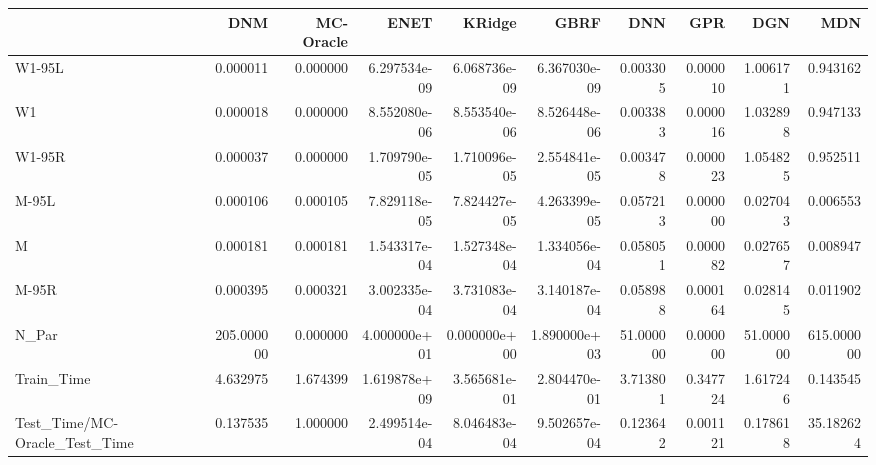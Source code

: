 \begin{tabular}{lrrrrrrrrr}
\toprule
{} &         DNM &  MC-Oracle &          ENET &        KRidge &          GBRF &        DNN &       GPR &        DGN &         MDN \\
\midrule
W1-95L                        &    0.000011 &   0.000000 &  6.297534e-09 &  6.068736e-09 &  6.367030e-09 &   0.003305 &  0.000010 &   1.006171 &    0.943162 \\
W1                            &    0.000018 &   0.000000 &  8.552080e-06 &  8.553540e-06 &  8.526448e-06 &   0.003383 &  0.000016 &   1.032898 &    0.947133 \\
W1-95R                        &    0.000037 &   0.000000 &  1.709790e-05 &  1.710096e-05 &  2.554841e-05 &   0.003478 &  0.000023 &   1.054825 &    0.952511 \\
M-95L                         &    0.000106 &   0.000105 &  7.829118e-05 &  7.824427e-05 &  4.263399e-05 &   0.057213 &  0.000000 &   0.027043 &    0.006553 \\
M                             &    0.000181 &   0.000181 &  1.543317e-04 &  1.527348e-04 &  1.334056e-04 &   0.058051 &  0.000082 &   0.027657 &    0.008947 \\
M-95R                         &    0.000395 &   0.000321 &  3.002335e-04 &  3.731083e-04 &  3.140187e-04 &   0.058988 &  0.000164 &   0.028145 &    0.011902 \\
N\_Par                         &  205.000000 &   0.000000 &  4.000000e+01 &  0.000000e+00 &  1.890000e+03 &  51.000000 &  0.000000 &  51.000000 &  615.000000 \\
Train\_Time                    &    4.632975 &   1.674399 &  1.619878e+09 &  3.565681e-01 &  2.804470e-01 &   3.713801 &  0.347724 &   1.617246 &    0.143545 \\
Test\_Time/MC-Oracle\_Test\_Time &    0.137535 &   1.000000 &  2.499514e-04 &  8.046483e-04 &  9.502657e-04 &   0.123642 &  0.001121 &   0.178618 &   35.182624 \\
\bottomrule
\end{tabular}

